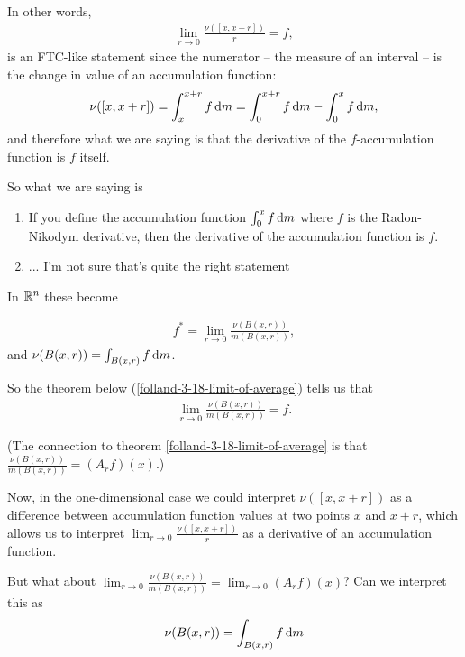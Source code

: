 In other words,
\begin{align*}
  \lim_{r \to 0}\frac{\nu([x,x + r])}{r} = f,
\end{align*}
is an FTC-like statement since the numerator -- the measure of an interval -- is the change in value of an
accumulation function:
\begin{align*}
  \nu([x, x + r]) = \int_x^{x + r} f \dm = \int_0^{x + r} f \dm - \int_0^{x} f \dm,
\end{align*}
and therefore what we are saying is that the derivative of the $f$-accumulation function is $f$ itself.


So what we are saying is
\begin{enumerate}
\item If you define the accumulation function $\int_0^x f \dm$ where $f$ is the Radon-Nikodym derivative, then the
  derivative of the accumulation function is $f$.
\item ... I'm not sure that's quite the right statement
\end{enumerate}

In $\mathbb{R}^n$ these become

\begin{align*}
  f^* = \lim_{r \to 0} \frac{\nu(B(x, r))}{m(B(x, r))},
\end{align*}
and $\nu(B(x, r)) = \int_{B(x, r)} f \dm$.

So the theorem below (\ref{folland-3-18-limit-of-average}) tells us that
\begin{align*}
  \lim_{r \to 0} \frac{\nu(B(x, r))}{m(B(x, r))} = f.
\end{align*}

(The connection to theorem \ref{folland-3-18-limit-of-average} is
that $\frac{\nu(B(x, r))}{m(B(x, r))} = (A_r f)(x)$.)

Now, in the one-dimensional case we could interpret $\nu([x, x + r])$ as a difference between accumulation
function values at two points $x$ and $x + r$, which allows us to
interpret $\lim_{r \to 0}\frac{\nu([x,x + r])}{r}$ as a derivative of an accumulation function.

But what about $\lim_{r \to 0} \frac{\nu(B(x, r))}{m(B(x, r))} = \lim_{r \to 0} (A_r f)(x)$? Can we interpret this as
\begin{align*}
  \nu(B(x, r)) = \int_{B(x, r)} f \dm
\end{align*}

